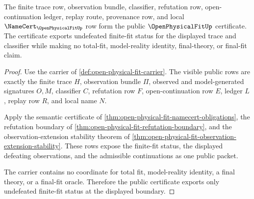 \begin{theorem}
\label{thm:open-physical-fit-public-certificate}
The finite trace row, observation bundle, classifier, refutation row, open-continuation ledger, replay route, provenance row, and local $\NameCert_{\OpenPhysicalFitUp}$ row form the public $\OpenPhysicalFitUp$ certificate. The certificate exports undefeated finite-fit status for the displayed trace and classifier while making no total-fit, model-reality identity, final-theory, or final-fit claim.
\end{theorem}
\begin{proof}
Use the carrier of \autoref{def:open-physical-fit-carrier}. The visible public rows are exactly the finite trace $H$, observation bundle $\Pi$, observed and model-generated signatures $O,M$, classifier $C$, refutation row $F$, open-continuation row $E$, ledger $L$, replay row $R$, and local name $N$.

Apply the semantic certificate of \autoref{thm:open-physical-fit-namecert-obligations}, the refutation boundary of \autoref{thm:open-physical-fit-refutation-boundary}, and the observation-extension stability theorem of \autoref{thm:open-physical-fit-observation-extension-stability}. These rows expose the finite-fit status, the displayed defeating observations, and the admissible continuations as one public packet.

The carrier contains no coordinate for total fit, model-reality identity, a final theory, or a final-fit oracle. Therefore the public certificate exports only undefeated finite-fit status at the displayed boundary.
\end{proof}




